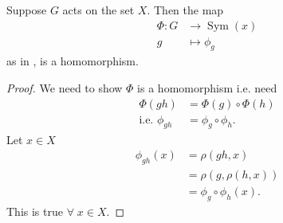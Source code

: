 \begin{proposition} \label{prp:6}
    Suppose $G$ acts on the set $X$.
    Then the map 
    \begin{align*}
        \Phi : G &\to \operatorname{Sym}(x) \\
        g &\mapsto \phi_g
    \end{align*} as in , is a homomorphism.
\end{proposition}  

\begin{proof}
    We need to show $\Phi$ is a homomorphism i.e. need
    \begin{align*}
        \Phi(gh) &= \Phi(g) \circ \Phi(h) \\
        \text{i.e. } \phi_{gh} &= \phi_g \circ \phi_h.
    \end{align*}  
    Let $x \in X$
    \begin{align*}
        \phi_{gh}(x) &= \rho(gh, x) \\
        &= \rho(g, \rho(h, x)) \\
        &= \phi_g \circ \phi_h (x).
    \end{align*} 
    This is true $\forall \; x \in X$.
\end{proof} 

